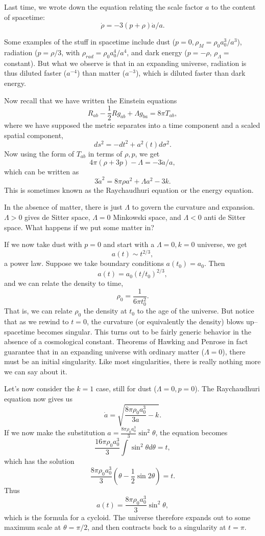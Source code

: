 Last time, we wrote down the equation relating the scale factor $a$ to the content of spacetime:
$$\dot \rho = -3(p+\rho)\dot a/a.$$

Some examples of the stuff in spacetime include dust ($p=0,\rho_M=\rho_0 a_0^3/a^3$), radiation ($p=\rho/3$, with $\rho_{rad}=\rho_0 a_0^4/a^4$, and dark energy ($p=-\rho$, $\rho_\Lambda=$constant).
But what we observe is that in an expanding universe, radiation is thus diluted faster ($a^{-4}$) than matter ($a^{-3}$), which is diluted faster than dark energy.

Now recall that we have written the Einstein equations
$$R_{ab}-\frac{1}{2}R g_{ab}+\Lambda g_{ba}=8\pi T_{ab},$$
where we have supposed the metric separates into a time component and a scaled spatial component,
$$ds^2=-dt^2+a^2(t) d\sigma^2.$$
Now using the form of $T_{ab}$ in terms of $\rho,p$, we get
$$4\pi(\rho+3p)-\Lambda=-3\ddot a/a,$$
which can be written as
$$3\dot a^2=8\pi \rho a^2 +\Lambda a^2 -3k.$$
This is sometimes known as the Raychaudhuri equation or the energy equation.%

In the absence of matter, there is just $\Lambda$ to govern the curvature and expansion. $\Lambda >0$ gives de Sitter space, $\Lambda=0$ Minkowski space, and $\Lambda <0$ anti de Sitter space. What happens if we put some matter in?

If we now take dust with $p=0$ and start with a $\Lambda=0,k=0$ universe, we get
$$a(t)\sim t^{2/3},$$
a power law. Suppose we take boundary conditions $a(t_0)=a_0.$ Then
$$a(t)=a_0 (t/t_0)^{2/3},$$
and we can relate the density to time,
$$\rho_0=\frac{1}{6\pi t_0^2}.$$
That is, we can relate $\rho_0$ the density at $t_0$ to the age of the universe. But notice that as we rewind to $t=0$, the curvature (or equivalently the density) blows up-- spacetime becomes singular. This turns out to be fairly generic behavior in the absence of a cosmological constant. Theorems of Hawking and Penrose in fact guarantee that in an expanding universe with ordinary matter ($\Lambda=0$), there must be an initial singularity. %
Like most singularities, there is really nothing more we can say about it.

Let's now consider the $k=1$ case, still for dust ($\Lambda=0,p=0$). The Raychaudhuri equation now gives us
$$\dot a=\sqrt{\frac{8\pi \rho_0 a_0^3}{3a}-k}.$$ If we now make the substitution $a=\frac{8\pi \rho_0 a_0^3}{3}\sin^2\theta$, the equation becomes
$$\frac{16\pi \rho_0 a_0^3}{3} \int \sin^2\theta d\theta =t,$$
which has the solution
$$\frac{8\pi \rho_0 a_0^3}{3}(\theta-\frac{1}{2}\sin 2\theta)=t.$$ Thus
$$a(t)=\frac{8\pi \rho_0 a_0^3}{3}\sin^2\theta,$$
which is the formula for a cycloid. The universe therefore expands out to some maximum scale at $\theta=\pi/2$, and then contracts back to a singularity at $t=\pi$.

